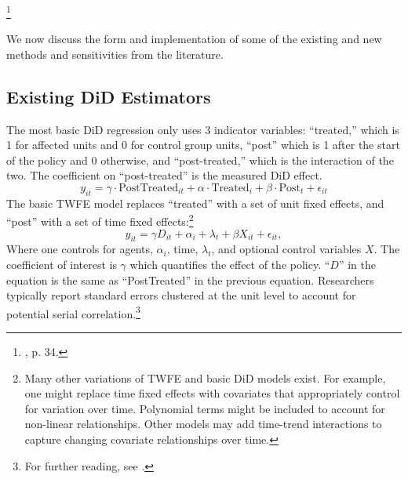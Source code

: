 \documentclass[12pt]{article}
\begin{document}
\begin{singlespace*}
\footnote{\citet{wooldridge2021two}, p. 34.}
\end{singlespace*}
\noindent We now discuss the form and implementation of some of the existing and new methods and sensitivities from the literature.
\subsection{Existing DiD Estimators}
The most basic DiD regression only uses 3 indicator variables: “treated,” which is 1 for affected units and 0 for control group units, “post” which is 1 after the start of the policy and 0 otherwise, and “post-treated,” which is the interaction of the two. The coefficient on “post-treated” is the measured DiD effect.
\begin{equation}
    y_{it} = \gamma \cdot \text{PostTreated}_{it} + \alpha\cdot \text{Treated}_i + \beta \cdot \text{Post}_t + \epsilon_{it}
\end{equation}
The basic TWFE model replaces “treated” with a set of unit fixed effects, and “post” with a set of time fixed effects:\footnote{Many other variations of TWFE and basic DiD models exist. For example, one might replace time fixed effects with covariates that appropriately control for variation over time. Polynomial terms might be included to account for non-linear relationships. Other models may add time-trend interactions to capture changing covariate relationships over time.}
\begin{equation}
    y_{it} = \gamma D_{it} + \alpha_i + \lambda_t + \beta X_{it} + \epsilon_{it},    
\end{equation}
Where one controls for agents, $\alpha_i$, time, $\lambda_t$, and optional control variables $X$. The coefficient of interest is $\gamma$ which quantifies the effect of the policy. “$D$” in the equation is the same as “PostTreated” in the previous equation. Researchers typically report standard errors clustered at the unit level to account for potential serial correlation.\footnote{For further reading, see \citet{bertrand2004}.} 
\end{document}
